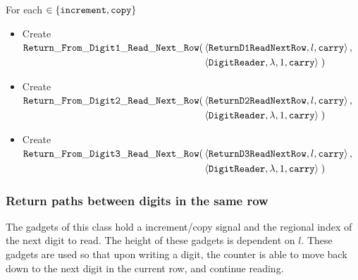         \noindent For each {\inc} $\in \{ {\tt increment, copy } \}$

        \begin{itemize}
            \item Create
            $\begin{aligned}[t]
                {\tt Return\_From\_Digit1\_Read\_Next\_Row}(& \left \langle {\tt ReturnD1ReadNextRow}, l, {\tt carry} \right\rangle, & \\
                                           & \left \langle {\tt DigitReader}, \lambda, 1, {\tt carry} \right\rangle \;)
            \end{aligned}$

            \item Create
            $\begin{aligned}[t]
                {\tt Return\_From\_Digit2\_Read\_Next\_Row}(& \left \langle {\tt ReturnD2ReadNextRow}, l, {\tt carry}  \right\rangle, & \\
                                           & \left \langle {\tt DigitReader}, \lambda, 1, {\tt carry} \right\rangle \;)
            \end{aligned}$

            \item Create
            $\begin{aligned}[t]
                {\tt Return\_From\_Digit3\_Read\_Next\_Row}(& \left \langle {\tt ReturnD3ReadNextRow}, l, {\tt carry} \right\rangle, & \\
                                             & \left \langle {\tt DigitReader}, \lambda, 1, {\tt carry} \right\rangle \;)
            \end{aligned}$
        \end{itemize}
    \vspace{1cm}



    \subsubsection{Return paths between digits in the same row}
        The gadgets of this class hold a increment/copy signal and the regional index
        of the next digit to read. The height of these gadgets is dependent on $l$.
        These gadgets are used so that upon writing a digit, the counter
        is able to move back down to the next digit in the current row, and continue
        reading.
        \vspace{1cm}

